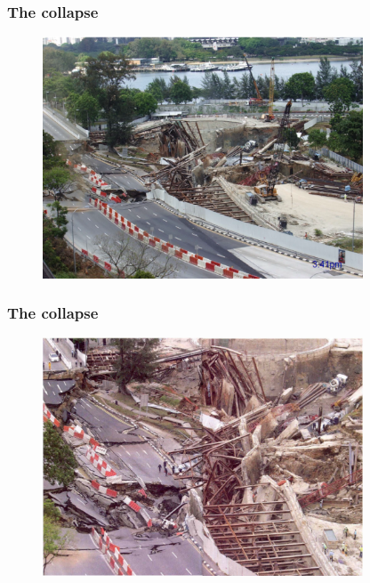 \documentclass[notes]{beamer}
\begin{document}
\begin{frame}
\frametitle{The collapse}
\begin{figure}[ht]
	\centering
	\includegraphics[width=0.85\textwidth]{figs/collapse4.png}
\end{figure}
\end{frame}

\begin{frame}
\frametitle{The collapse}
\begin{figure}[ht]
	\centering
	\includegraphics[width=0.85\textwidth]{figs/collapse5.png}
\end{figure}
\end{frame}
\end{document}
